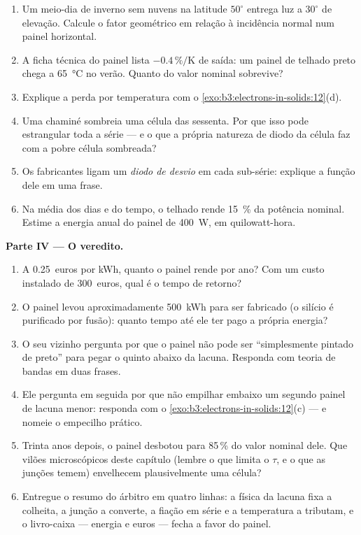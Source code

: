 \begin{problem}
\begin{enumerate}[resume]
  \item Um meio-dia de inverno sem nuvens na latitude $50^\circ$ entrega
        luz a $30^\circ$ de elevação. Calcule o fator geométrico
        em relação à incidência normal num painel
        horizontal.
  \item A ficha técnica do painel lista $-0.4\,\%/\text{K}$ de saída:
        um painel de telhado preto chega a \qty{65}{\celsius} no verão.
        Quanto do valor nominal sobrevive?
  \item Explique a perda por temperatura com o
        \cref{exo:b3:electrons-in-solids:12}(d).
  \item Uma chaminé sombreia uma célula das sessenta. Por que isso pode
        estrangular toda a série --- e o que a própria natureza de
        diodo da célula faz com a pobre célula sombreada?
  \item Os fabricantes ligam um \emph{diodo de desvio} em cada
        sub-série: explique a função dele em uma frase.
  \item Na média dos dias e do tempo, o telhado rende
        \qty{15}{\percent} da potência nominal. Estime a energia anual
        do painel de \qty{400}{W}, em quilowatt-hora.
\end{enumerate}

\medskip\noindent\textbf{Parte IV --- O veredito.}

\begin{enumerate}[resume]
  \item A \qty{0.25}{euros} por kWh, quanto o painel rende
        por ano? Com um custo instalado de \qty{300}{euros},
        qual é o tempo de retorno?
  \item O painel levou aproximadamente \qty{500}{kWh} para ser
        fabricado (o silício é purificado por fusão): quanto tempo até
        ele ter pago a própria energia?
  \item O seu vizinho pergunta por que o painel não pode ser
        ``simplesmente pintado de preto'' para pegar o quinto abaixo da
        lacuna. Responda com teoria de bandas em duas frases.
  \item Ele pergunta em seguida por que não empilhar embaixo um segundo
        painel de lacuna menor: responda com o
        \cref{exo:b3:electrons-in-solids:12}(c) --- e nomeie o
        empecilho prático.
  \item Trinta anos depois, o painel desbotou para 85\,\% do valor
        nominal dele. Que vilões microscópicos deste capítulo
        (lembre o que limita o $\tau$, e o que as junções temem)
        envelhecem plausivelmente uma célula?
  \item Entregue o resumo do árbitro em quatro linhas: a física da
        lacuna fixa a colheita, a junção a converte, a fiação em série
        e a temperatura a tributam, e o livro-caixa --- energia
        e euros --- fecha a favor do painel.
\end{enumerate}
\end{problem}
